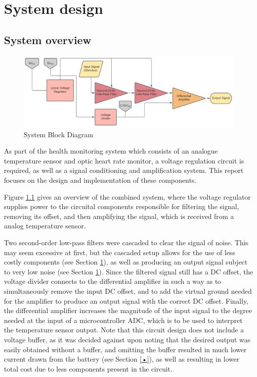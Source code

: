 
\chapter{System design}
	\section{System overview} \label{sec:system}

\begin{figure}[h]
    \centering
    \includegraphics[width = 1\textwidth]{Figures/1.1_block}
    \caption{System Block Diagram}
    \label{fig:1.1_block}
\end{figure}

As part of the health monitoring system which consists of an analogue temperature sensor and optic heart rate monitor, a voltage regulation circuit is required, as well as a signal conditioning and amplification system. This report focuses on the design and implementation of these components. 

Figure \ref{fig:1.1_block} gives an overview of the combined system, where the voltage regulator supplies power to the circuital components responsible for filtering the signal, removing its offset, and then amplifying the signal, which is received from a analog temperature sensor.

Two second-order low-pass filters were cascaded to clear the signal of noise. This may seem excessive at first, but the cascaded setup allows for the use of less costly components (see Section \ref{}), as well as producing an output signal subject to very low noise (see Section \ref{}). Since the filtered signal still has a DC offset, the voltage divider connects to the differential amplifier in such a way as to simultaneously remove the input DC offset, and to add the virtual ground needed for the amplifier to produce an output signal with the correct DC offset. Finally, the differential amplifier increases the magnitude of the input signal to the degree needed at the input of a microcontroller ADC, which is to be used to interpret the temperature sensor output. Note that this circuit design does not include a voltage buffer, as it was decided against upon noting that the desired output was easily obtained without a buffer, and omitting the buffer resulted in much lower current drawn from the battery (see Section \ref{•}), as well as resulting in lower total cost due to less components present in the circuit.

\vfill









